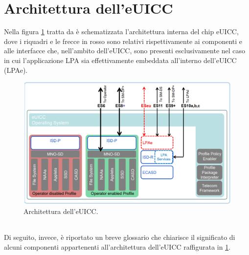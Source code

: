 \documentclass[10pt, twoside, openany]{book}
\begin{document}
\section{Architettura dell'eUICC}
Nella figura \ref{fig:eUICC-arch} tratta da \cite{GSMA-docs-new} è schematizzata l'architettura interna del chip eUICC, dove i riquadri e le frecce in rosso sono relativi rispettivamente ai componenti e alle interfacce che, nell'ambito dell'eUICC, sono presenti esclusivamente nel caso in cui l'applicazione LPA sia effettivamente embeddata all'interno dell'eUICC (LPAe).
\begin{figure}
\includegraphics[width=\linewidth]{eUICC-arch.png}
\caption{Architettura dell'eUICC.}
\label{fig:eUICC-arch}
\end{figure}
\\Di seguito, invece, è riportato un breve glossario che chiarisce il significato di alcuni componenti appartenenti all'architettura dell'eUICC raffigurata in \ref{fig:eUICC-arch}.
\end{document}

